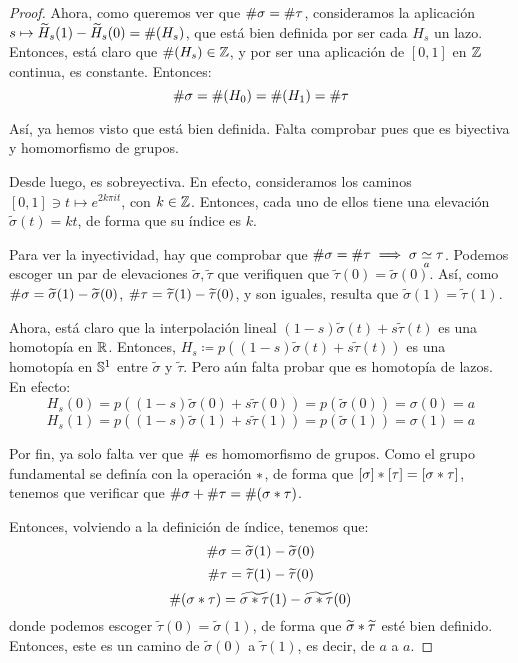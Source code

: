 \begin{theo}
\begin{proof}
Ahora, como queremos ver que $\indice\sigma = \indice\tau$, consideramos la aplicación $s\mapsto \widetilde{H}_s(1)-\widetilde{H}_s(0)=\indice(H_s)$, que está bien definida por ser cada $H_s$ un lazo. Entonces, está claro que $\indice(H_s)\in\Z$, y por ser una aplicación de $[0,1]$ en $\Z$ continua, es constante. Entonces:
\[\indice\sigma = \indice(H_0) = \indice(H_1) = \indice\tau\]

Así, ya hemos visto que está bien definida. Falta comprobar pues que es biyectiva y homomorfismo de grupos.

Desde luego, es sobreyectiva. En efecto, consideramos los caminos $[0,1]\ni t\mapsto e^{2k\pi it}$, con $k\in\Z$.  Entonces, cada uno de ellos tiene una elevación $\widetilde{\sigma}(t)=kt$, de forma que su índice es $k$.

Para ver la inyectividad, hay que comprobar que $\indice\sigma = \indice\tau\implies \sigma\homot[a]\tau$. Podemos escoger un par de elevaciones $\widetilde{\sigma},\widetilde{\tau}$ que verifiquen que $\widetilde{\tau}(0)=\widetilde{\sigma}(0)$. Así, como $\indice\sigma = \widetilde{\sigma}(1)-\widetilde{\sigma}(0)$, $\indice\tau = \widetilde{\tau}(1)-\widetilde{\tau}(0)$, y son iguales, resulta que $\widetilde{\sigma}(1)=\widetilde{\tau}(1)$.

Ahora, está claro que la interpolación lineal $(1-s)\widetilde{\sigma}(t) + s\widetilde{\tau}(t)$ es una homotopía en $\R$. Entonces, $H_s \coloneqq p((1-s)\widetilde{\sigma}(t) + s\widetilde{\tau}(t))$ es una homotopía en $\Sfe^1$ entre $\widetilde{\sigma}$ y $\widetilde{\tau}$. Pero aún falta probar que es homotopía de lazos. En efecto:
\[H_s(0)= p((1-s)\widetilde{\sigma}(0) + s\widetilde{\tau}(0))=p(\widetilde{\sigma}(0))=\sigma(0)=a\]
\[H_s(1)= p((1-s)\widetilde{\sigma}(1) + s\widetilde{\tau}(1))=p(\widetilde{\sigma}(1))=\sigma(1)=a\]

Por fin, ya solo falta ver que $\indice$ es homomorfismo de grupos. Como el grupo fundamental se definía con la operación $\pathp$, de forma que $[\sigma]\pathp[\tau]=[\sigma\pathp\tau]$, tenemos que verificar que $\indice\sigma + \indice\tau = \indice(\sigma\pathp\tau)$.

Entonces, volviendo a la definición de índice, tenemos que:
\[\indice\sigma = \widetilde{\sigma}(1)-\widetilde{\sigma}(0)\]
\[\indice\tau = \widetilde{\tau}(1)-\widetilde{\tau}(0)\]
\[\indice(\sigma\pathp\tau) = \widetilde{\sigma\pathp\tau}(1)-\widetilde{\sigma\pathp\tau}(0)\]
donde podemos escoger $\widetilde{\tau}(0)=\widetilde{\sigma}(1)$, de forma que $\widetilde{\sigma}\pathp\widetilde{\tau}$ esté bien definido. Entonces, este es un camino de $\widetilde{\sigma}(0)$ a $\widetilde{\tau}(1)$, es decir, de $a$ a $a$.


\end{proof}
\end{theo}
